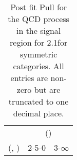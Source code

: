 \begin{table}[h!]
\tiny
\centering
\caption{Post fit Pull for the QCD process in the signal region for 2.1\ifb for symmetric categories. All entries are non-zero but are truncated to one decimal place.\label{tab:pullseppost_sig_qcd_sym}}
\begin{tabular}
{ccc}
	\hline\hline
	& \multicolumn{2}{c}{\scalht (\gev)} \\ 
	 (\njet,  \nb) & 2-5-0 & 3-$\infty$ \\ [0.8ex] 
\hline
	\hline
	\hline
\end{tabular}
\end{table}
